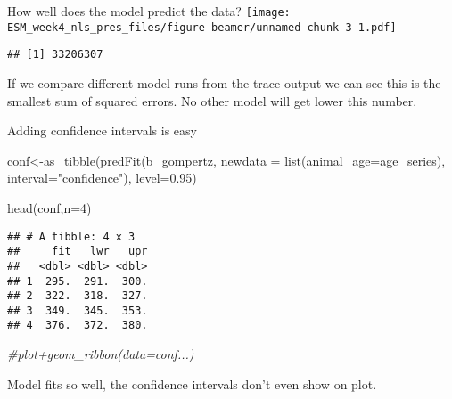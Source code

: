 \documentclass[
  ignorenonframetext,
]{beamer}
\newenvironment{Shaded}{\begin{snugshade}}{\end{snugshade}}
\newcommand{\AttributeTok}[1]{\textcolor[rgb]{0.77,0.63,0.00}{#1}}
\newcommand{\CommentTok}[1]{\textcolor[rgb]{0.56,0.35,0.01}{\textit{#1}}}
\newcommand{\DecValTok}[1]{\textcolor[rgb]{0.00,0.00,0.81}{#1}}
\newcommand{\FloatTok}[1]{\textcolor[rgb]{0.00,0.00,0.81}{#1}}
\newcommand{\FunctionTok}[1]{\textcolor[rgb]{0.00,0.00,0.00}{#1}}
\newcommand{\NormalTok}[1]{#1}
\newcommand{\OtherTok}[1]{\textcolor[rgb]{0.56,0.35,0.01}{#1}}
\newcommand{\SpecialCharTok}[1]{\textcolor[rgb]{0.00,0.00,0.00}{#1}}
\newcommand{\StringTok}[1]{\textcolor[rgb]{0.31,0.60,0.02}{#1}}
\begin{document}
\begin{frame}{How well does the model predict the data?}
\protect\hypertarget{how-well-does-the-model-predict-the-data}{}
\texttt{[image: ESM\_week4\_nls\_pres\_files/figure-beamer/unnamed-chunk-3-1.pdf]}
\end{frame}

\begin{frame}[fragile]{}
\protect\hypertarget{section}{}
\begin{Shaded}
\end{Shaded}

\begin{verbatim}
## [1] 33206307
\end{verbatim}

If we compare different model runs from the trace output we can see this
is the smallest sum of squared errors. No other model will get lower
this number.
\end{frame}

\begin{frame}[fragile]{Adding confidence intervals is easy}
\protect\hypertarget{adding-confidence-intervals-is-easy}{}
\small

\begin{Shaded}
\begin{Highlighting}[]
\NormalTok{conf}\OtherTok{\textless{}{-}}\FunctionTok{as\_tibble}\NormalTok{(}\FunctionTok{predFit}\NormalTok{(b\_gompertz,}
            \AttributeTok{newdata =} \FunctionTok{list}\NormalTok{(}\AttributeTok{animal\_age=}\NormalTok{age\_series),}
            \AttributeTok{interval=}\StringTok{"confidence"}\NormalTok{),}
            \AttributeTok{level=}\FloatTok{0.95}\NormalTok{) }

\FunctionTok{head}\NormalTok{(conf,}\AttributeTok{n=}\DecValTok{4}\NormalTok{)}
\end{Highlighting}
\end{Shaded}

\begin{verbatim}
## # A tibble: 4 x 3
##     fit   lwr   upr
##   <dbl> <dbl> <dbl>
## 1  295.  291.  300.
## 2  322.  318.  327.
## 3  349.  345.  353.
## 4  376.  372.  380.
\end{verbatim}

\begin{Shaded}
\begin{Highlighting}[]
\CommentTok{\#plot+geom\_ribbon(data=conf...)}
\end{Highlighting}
\end{Shaded}

Model fits so well, the confidence intervals don't even show on plot.
\end{frame}
\end{document}
